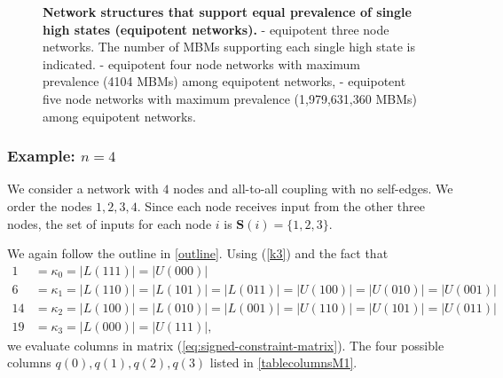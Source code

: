 \documentclass[12pt]{amsart}
\newcommand{\Sources}{\mathbf{S}}
\theoremstyle{definition}
\begin{document}
\begin{figure}[ht!]
\begin{subfigure}{0.45\textwidth}
        \caption{}
        \label{fig:5Eq_1_1}
        \end{subfigure}
    \caption{
    \textbf{Network structures that support equal prevalence of single high states (equipotent networks).} - equipotent three node networks. The number of MBMs supporting each single high state is indicated. - equipotent four node networks with maximum prevalence (4104 MBMs) among equipotent networks, - equipotent five node networks with maximum prevalence (1,979,631,360 MBMs) among equipotent networks.}
    \label{fig:EqNet}
\end{figure}

\subsubsection*{Example: $n=4$ }
We consider a network with $4$ nodes and all-to-all coupling with no self-edges. We order the nodes $1,2,3,4$. Since each node receives input from the other three nodes, the set of inputs for each node $i$ is $\Sources(i)=\{1,2,3\}.$

We again follow the outline in \cref{outline}. Using (\ref{k3}) and the fact that 
\begin{align*}
    1 &= \kappa_0 = |L(111)|=|U(000)| \\
    6 &= \kappa_1 = |L(110)|=|L(101)| =|L(011)|=|U(100)|=|U(010)|=|U(001)| \\
    14 &= \kappa_2 = |L(100)|=|L(010)| =|L(001)|=|U(110)|=|U(101)|=|U(011)| \\
    19 &= \kappa_3 = |L(000)|=|U(111)| ,
\end{align*}
we evaluate columns in matrix (\ref{eq:signed-constraint-matrix}). The four possible columns $q(0),q(1), q(2), q(3)$ listed in \cref{tablecolumnsM1}. 
\end{document}
